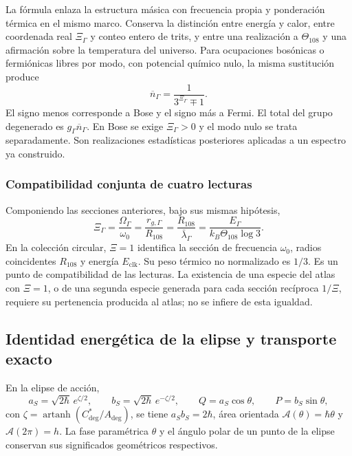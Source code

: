La fórmula enlaza la estructura másica con frecuencia propia y ponderación
térmica en el mismo marco. Conserva la distinción entre energía y calor,
entre coordenada real $\Xi_\Gamma$ y conteo entero de trits, y entre una
realización a $\Theta_{108}$ y una afirmación sobre la temperatura del
universo. Para ocupaciones bosónicas o fermiónicas libres por modo, con
potencial químico nulo, la misma sustitución produce
\begin{equation}
 \overline n_\Gamma=\frac{1}{3^{\Xi_\Gamma}\mp1}.
 \label{md:hib:ocupaciones}
\end{equation}
El signo menos corresponde a Bose y el signo más a Fermi. El total del
grupo degenerado es $g_\Gamma\overline n_\Gamma$. En Bose se exige
$\Xi_\Gamma>0$ y el modo nulo se trata separadamente. Son realizaciones
estadísticas posteriores aplicadas a un espectro ya construido.

\subsubsection{Compatibilidad conjunta de cuatro lecturas}
\label{md:hib:cuatro-lecturas}

Componiendo las secciones anteriores, bajo sus mismas hipótesis,
\begin{equation}
 \boxed{\Xi_\Gamma=\frac{\Omega_\Gamma}{\omega_0}
 =\frac{r_{g,\Gamma}}{R_{108}}
 =\frac{R_{108}}{\bar\lambda_\Gamma}
 =\frac{E_\Gamma}{k_B\Theta_{108}\log3}.}
 \label{md:hib:compatibilidad-cuatro}
\end{equation}
En la colección circular, $\Xi=1$ identifica la sección de frecuencia
$\omega_0$, radios coincidentes $R_{108}$ y energía $E_{\mathrm{clk}}$.
Su peso térmico no normalizado es $1/3$. Es un punto de compatibilidad de
las lecturas. La existencia de una especie del atlas con $\Xi=1$, o de
una segunda especie generada para cada sección recíproca $1/\Xi$, requiere
su pertenencia producida al atlas; no se infiere de esta igualdad.

\subsection{Identidad energética de la elipse y transporte exacto}
\label{md:hib:elipse}

En la elipse de acción,
\begin{equation}
 a_S=\sqrt{2\hbar}\,e^{\zeta/2},\qquad
 b_S=\sqrt{2\hbar}\,e^{-\zeta/2},\qquad
 Q=a_S\cos\theta,\qquad P=b_S\sin\theta,
 \label{md:hib:elipse-coordenadas}
\end{equation}
con $\zeta=\operatorname{artanh}(C^*_{\deg}/A_{\deg})$, se tiene
$a_Sb_S=2\hbar$, área orientada
$\mathcal A(\theta)=\hbar\theta$ y $\mathcal A(2\pi)=h$.
La fase paramétrica $\theta$ y el ángulo polar de un punto de la elipse
conservan sus significados geométricos respectivos.

